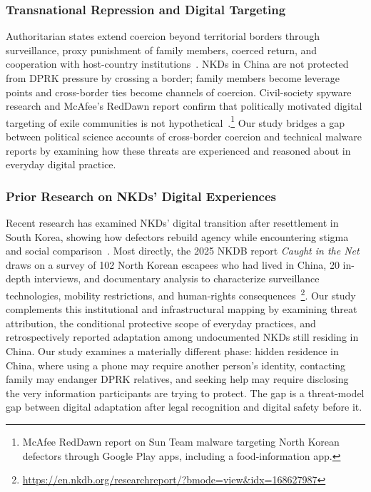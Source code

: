 \documentclass[conference,compsoc]{IEEEtran}
\begin{document}
\subsubsection{Transnational Repression and Digital Targeting}

Authoritarian states extend coercion beyond territorial borders through surveillance, proxy punishment of family members, coerced return, and cooperation with host-country institutions~\cite{moss2016transnational,moss2022going,glasius2018extraterritorial,tsourapas2021global}. NKDs in China are not protected from DPRK pressure by crossing a border; family members become leverage points and cross-border ties become channels of coercion. Civil-society spyware research and McAfee's RedDawn report confirm that politically motivated digital targeting of exile communities is not hypothetical~\cite{marczak2022hooking}.\footnote{McAfee RedDawn report on Sun Team malware targeting North Korean defectors through Google Play apps, including a food-information app.} Our study bridges a gap between political science accounts of cross-border coercion and technical malware reports by examining how these threats are experienced and reasoned about in everyday digital practice.


\subsubsection{Prior Research on NKDs' Digital Experiences}

Recent research has examined NKDs' digital transition after resettlement in South Korea, showing how defectors rebuild agency while encountering stigma and social comparison~\cite{noh2024starting,noh2025bridging,noh2026regaining}. Most directly, the 2025 NKDB report \emph{Caught in the Net} draws on a survey of 102 North Korean escapees who had lived in China, 20 in-depth interviews, and documentary analysis to characterize surveillance technologies, mobility restrictions, and human-rights consequences~\footnote{\url{https://en.nkdb.org/researchreport/?bmode=view&idx=168627987}}. Our study complements this institutional and infrastructural mapping by examining threat attribution, the conditional protective scope of everyday practices, and retrospectively reported adaptation among undocumented NKDs still residing in China. Our study examines a materially different phase: hidden residence in China, where using a phone may require another person's identity, contacting family may endanger DPRK relatives, and seeking help may require disclosing the very information participants are trying to protect. The gap is a threat-model gap between digital adaptation after legal recognition and digital safety before it.
\end{document}
